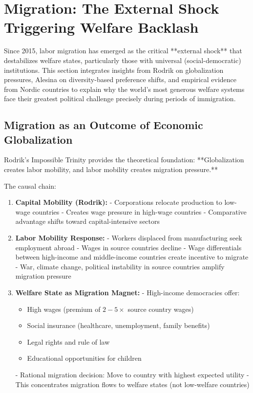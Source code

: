\section{Migration: The External Shock Triggering Welfare Backlash}
\label{sec:migration}

Since 2015, labor migration has emerged as the critical **external shock** that destabilizes welfare states, particularly those with universal (social-democratic) institutions. This section integrates insights from Rodrik on globalization pressures, Alesina on diversity-based preference shifts, and empirical evidence from Nordic countries to explain why the world's most generous welfare systems face their greatest political challenge precisely during periods of immigration.

\subsection{Migration as an Outcome of Economic Globalization}

Rodrik's Impossible Trinity provides the theoretical foundation: **Globalization creates labor mobility, and labor mobility creates migration pressure.**

The causal chain:

\begin{enumerate}

\item \textbf{Capital Mobility (Rodrik):}
   - Corporations relocate production to low-wage countries
   - Creates wage pressure in high-wage countries
   - Comparative advantage shifts toward capital-intensive sectors

\item \textbf{Labor Mobility Response:}
   - Workers displaced from manufacturing seek employment abroad
   - Wages in source countries decline
   - Wage differentials between high-income and middle-income countries create incentive to migrate
   - War, climate change, political instability in source countries amplify migration pressure

\item \textbf{Welfare State as Migration Magnet:}
   - High-income democracies offer:
     \begin{itemize}[nosep]
     \item High wages (premium of $2-5\times$ source country wages)
     \item Social insurance (healthcare, unemployment, family benefits)
     \item Legal rights and rule of law
     \item Educational opportunities for children
     \end{itemize}
   - Rational migration decision: Move to country with highest expected utility
   - This concentrates migration flows to welfare states (not low-welfare countries)

\end{enumerate}


